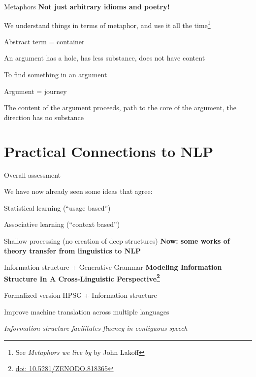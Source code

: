 \documentclass[aspectratio=169,cramped]{beamer}
\let\tempone\itemize
\let\temptwo\enditemize
\renewenvironment{itemize}{\tempone\addtolength{\itemsep}{-0\baselineskip}\addtolength{\parskip}{-0.2\baselineskip}}{\temptwo}
\newcommand{\ex}[1]{{\color{teal} #1}}
\newcommand*{\doi}[1]{\href{http://doai.io/#1}{doi: #1}}
\begin{document}
\begin{frame}{Metaphors}
	\textbf{Not just arbitrary idioms and poetry!}
\begin{itemize}
  \item We understand things in terms of metaphor, and use it all the time\footnote{See
      \textit{Metaphors we live by} by John Lakoff}
  \item Abstract term = container
    \begin{itemize}
    \item \ex{An argument has a hole, has less substance, does not have content}
    \item \ex{To find something in an argument}
    \end{itemize}
  \item Argument = journey
    \begin{itemize}
    \item \ex{The content of the argument proceeds, path to the core of the argument, the direction
        has no substance}
    \end{itemize}
  \end{itemize}
\end{frame}


\section{Practical Connections to NLP}

\begin{frame}{Overall assessment}
  \begin{itemize}
  \item We have now already seen some ideas that agree:
    \begin{itemize}
    \item Statistical learning (``usage based'')
    \item Associative learning (``context based'')
    \item Shallow processing (no creation of deep structures)
    \end{itemize}
  \end{itemize}
  \textbf{Now: some works of theory transfer from linguistics to NLP}
\end{frame}

\begin{frame}{Information structure + Generative Grammar}
	\textbf{Modeling Information Structure In A Cross-Linguistic Perspective\footnote{\protect\doi{10.5281/ZENODO.818365}}}
  \begin{itemize}
  \item Formalized version HPSG + Information structure
  \item Improve machine translation across multiple languages
  \item \textit{Information structure facilitates fluency in contiguous speech}
  \end{itemize}
\end{frame}
\end{document}
